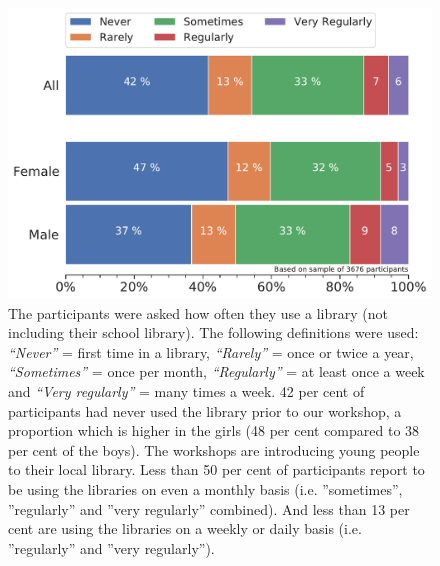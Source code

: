 \documentclass[12pt]{report} %
\begin{document}
\begin{figure}[t!]
    \centering
        \includegraphics[width=1\textwidth]{bar_VisitLibraryBefore}
\caption{The participants were asked how often they use a library (not including their school library). The following definitions were used:  \textit{``Never''} = first time in a library,  \textit{``Rarely''} = once or twice a year, \textit{``Sometimes''} = once per month,  \textit{``Regularly''} = at least once a week and  \textit{``Very regularly''} = many times a week. 42 per cent of participants had never used the library prior to our workshop, a proportion which is higher in the girls (48 per cent compared to 38 per cent of the boys). The workshops are introducing young people to their local library. Less than 50 per cent of participants report to be using the libraries on even a monthly basis (i.e. ''sometimes'', ''regularly'' and ''very regularly'' combined). And less than 13 per cent are using the libraries on a weekly or daily basis (i.e. ''regularly'' and ''very regularly'').} 
\label{fig:libusefreq}
\end{figure}
\end{document}
